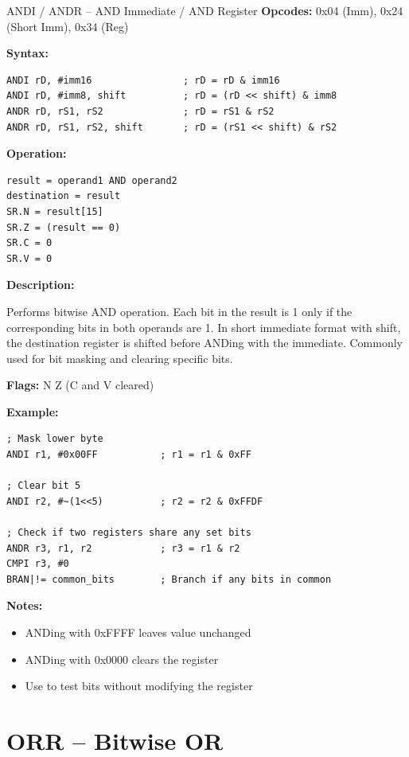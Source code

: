 \begin{instructionbox}{ANDI / ANDR -- AND Immediate / AND Register}
	\textbf{Opcodes:} 0x04 (Imm), 0x24 (Short Imm), 0x34 (Reg)

	\textbf{Syntax:}
	\begin{lstlisting}
ANDI rD, #imm16                ; rD = rD & imm16
ANDI rD, #imm8, shift          ; rD = (rD << shift) & imm8
ANDR rD, rS1, rS2              ; rD = rS1 & rS2
ANDR rD, rS1, rS2, shift       ; rD = (rS1 << shift) & rS2
\end{lstlisting}

	\textbf{Operation:}
	\begin{verbatim}
result = operand1 AND operand2
destination = result
SR.N = result[15]
SR.Z = (result == 0)
SR.C = 0
SR.V = 0
\end{verbatim}

	\textbf{Description:}

	Performs bitwise AND operation. Each bit in the result is 1 only if the corresponding bits in both operands are 1. In
	short immediate format with shift, the destination register is shifted before ANDing with the immediate. Commonly used
	for bit masking and clearing specific bits.

	\textbf{Flags:} N Z (C and V cleared)

	\textbf{Example:}
	\begin{lstlisting}
; Mask lower byte
ANDI r1, #0x00FF           ; r1 = r1 & 0xFF

; Clear bit 5
ANDI r2, #~(1<<5)          ; r2 = r2 & 0xFFDF

; Check if two registers share any set bits
ANDR r3, r1, r2            ; r3 = r1 & r2
CMPI r3, #0
BRAN|!= common_bits        ; Branch if any bits in common
\end{lstlisting}

	\textbf{Notes:}
	\begin{itemize}
		\item ANDing with 0xFFFF leaves value unchanged
		\item ANDing with 0x0000 clears the register
		\item Use  to test bits without modifying the register
	\end{itemize}
\end{instructionbox}

\section{ORR -- Bitwise OR}

